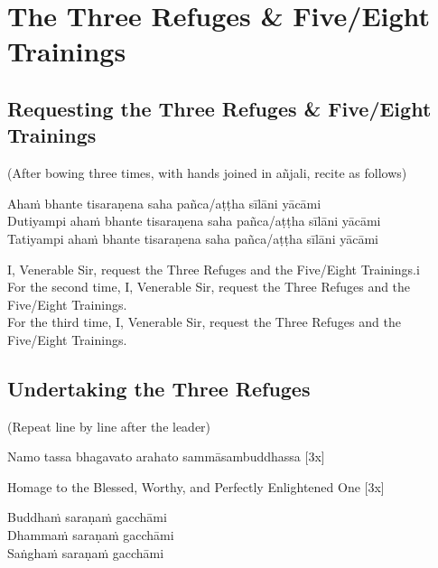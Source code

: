 \section{The Three Refuges \& Five/Eight Trainings}
\subsection{Requesting the Three Refuges \& Five/Eight Trainings}

\begin{center}
(After bowing three times, with hands joined in añjali, recite as follows)\\
\end{center}

Ahaṁ bhante tisaraṇena saha pañca/aṭṭha sīlāni yācāmi\\
Dutiyampi ahaṁ bhante tisaraṇena saha pañca/aṭṭha sīlāni yācāmi\\
Tatiyampi ahaṁ bhante tisaraṇena saha pañca/aṭṭha sīlāni yācāmi\\

\begin{english}
I, Venerable Sir, request the Three Refuges and the Five/Eight Trainings.i\\
For the second time, I, Venerable Sir, request the Three Refuges and the Five/Eight Trainings.\\
For the third time, I, Venerable Sir, request the Three Refuges and the Five/Eight Trainings.
\end{english}

\subsection{Undertaking the Three Refuges}

\begin{center}
(Repeat line by line after the leader)\\
\end{center}

Namo tassa bhagavato arahato sammāsambuddhassa \hfill{[3x]}\\


\begin{english}
Homage to the Blessed, Worthy, and Perfectly Enlightened One \hfill{[3x]}\\
\end{english}

Buddhaṁ saraṇaṁ gacchāmi\\
Dhammaṁ saraṇaṁ gacchāmi\\
Saṅghaṁ saraṇaṁ gacchāmi\\

